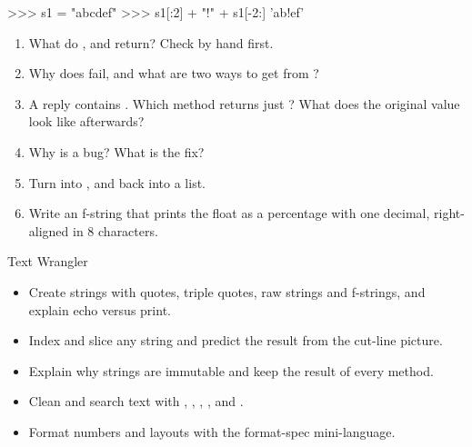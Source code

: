 \begin{pycode}
>>> s1 = "abcdef"
>>> s1[:2] + "!" + s1[-2:]
'ab!ef'
\end{pycode}

\begin{practice}
\begin{enumerate}[itemsep=1pt]
\item What do ,  and  return? Check by hand first.
\item Why does  fail, and what are two ways to get  from ?
\item A reply contains . Which method returns just ? What does the original value look like afterwards?
\item Why is  a bug? What is the fix?
\item Turn \code{["a", "b", "c"]} into , and back into a list.
\item Write an f-string that prints the float  as a percentage with one decimal, right-aligned in 8 characters.
\end{enumerate}
\end{practice}

\begin{achievement}{Text Wrangler}
\begin{itemize}[itemsep=1pt]
\item Create strings with quotes, triple quotes, raw strings and f-strings, and explain echo versus print.
\item Index and slice any string and predict the result from the cut-line picture.
\item Explain why strings are immutable and keep the result of every method.
\item Clean and search text with , , , ,  and .
\item Format numbers and layouts with the format-spec mini-language.
\end{itemize}
\end{achievement}
